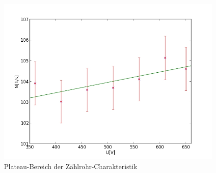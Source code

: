 	\begin{figure}[h]
		\begin{center}
		\includegraphics[scale=0.75]{picAlinregwitherrors.jpg}
		\caption{Plateau-Bereich der Zählrohr-Charakteristik}
		\label{picAlinregwitherrors}
		\end{center}	
	\end{figure}